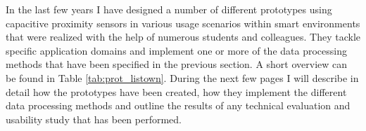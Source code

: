 In the last few years I have designed a number of different prototypes using capacitive proximity sensors in various usage scenarios within smart environments that were realized with the help of numerous students and colleagues. They tackle specific application domains and implement one or more of the data processing methods that have been specified in the previous section. A short overview can be found in Table \ref{tab:prot_listown}. During the next few pages I will describe in detail how the prototypes have been created, how they implement the different data processing methods and outline the results of any technical evaluation and usability study that has been performed.

\clearpage

\clearpage

\clearpage

\clearpage

\clearpage

\clearpage

\clearpage

